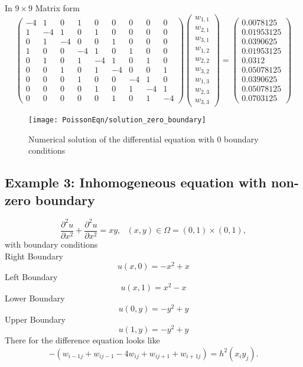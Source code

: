 In $9\times 9$ Matrix form
\[\left(\begin{array}{ccccccccc}
-4& 1 & 0 &1 &0 &0 &0 &0 &0\\
1&-4& 1 & 0 &1 &0 &0 &0 &0 \\
0 &1&-4&  0&0 &1 &0 &0 &0 \\
1 &0 &0 &-4& 1 & 0 &1 &0 &0\\
0 & 1 &0 &1&-4& 1 &0 &1 &0  \\
0 &0 &1 &0 &1&-4&0&  0 &1  \\
0&0&0&1 &0 &0 &-4& 1 & 0\\
0&0&0&0 & 1 &0 &1&-4& 1   \\
0&0&0&0 &0 &1 &0 &1&-4
\end{array}\right)
\left(\begin{array}{c}
w_{1,1}\\
w_{2,1}\\
w_{3,1}\\
w_{1,2}\\
w_{2,2}\\
w_{3,2}\\
w_{1,3}\\
w_{2,3}\\
w_{3,3}
\end{array}\right)=
\left(\begin{array}{c}
0.0078125\\
0.01953125\\
0.0390625 \\
 0.01953125\\
 0.0312\\
0.05078125\\
0.0390625\\
0.05078125\\
0.0703125
\end{array}\right)
\]	
\begin{figure}[H]
  \caption{Numerical solution of the differential equation with 0 boundary conditions }
  \centering
    \texttt{[image: PoissonEqn/solution\_zero\_boundary]}
\end{figure}

\subsection{Example 3: Inhomogeneous equation with non-zero boundary}
\[ \frac{\partial^2 u}{\partial x^2}+\frac{\partial^2 u}{\partial x^2}=xy, \ \ \ (x,y) \in \Omega=(0,1)\times (0,1), \]
with boundary conditions\\
Right Boundary
\[u(x,0) =-x^2+x \]
Left Boundary
\[u(x,1) = x^2-x  \]
Lower Boundary
\[u(0,y) = -y^2+y \]
Upper Boundary
\[u(1,y) =  -y^2+y \]
There for the difference equation looks like
\[-(w_{i-1j}+w_{ij-1}-4w_{ij}+w_{ij+1}+w_{i+1j})=h^2(x_iy_j). \]

